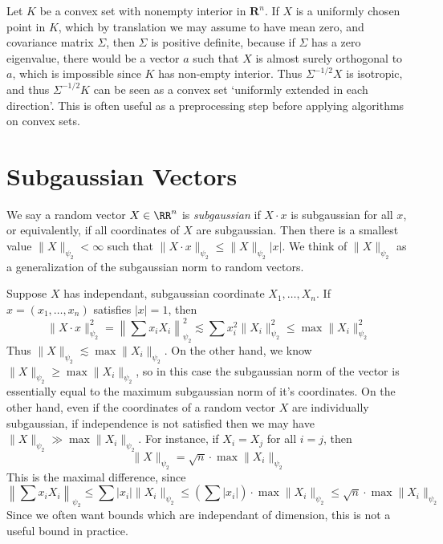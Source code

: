 \begin{example}
    Let $K$ be a convex set with nonempty interior in $\mathbf{R}^n$. If $X$ is a uniformly chosen point in $K$, which by translation we may assume to have mean zero, and covariance matrix $\Sigma$, then $\Sigma$ is positive definite, because if $\Sigma$ has a zero eigenvalue, there would be a vector $a$ such that $X$ is almost surely orthogonal to $a$, which is impossible since $K$ has non-empty interior. Thus $\Sigma^{-1/2} X$ is isotropic, and thus $\Sigma^{-1/2} K$ can be seen as a convex set `uniformly extended in each direction'. This is often useful as a preprocessing step before applying algorithms on convex sets.
\end{example}

\section{Subgaussian Vectors}

We say a random vector $X \in \RR^n$ is {\it subgaussian} if $X \cdot x$ is subgaussian for all $x$, or equivalently, if all coordinates of $X$ are subgaussian. Then there is a smallest value $\| X \|_{\psi_2} < \infty$ such that $\| X \cdot x \|_{\psi_2} \leq \| X \|_{\psi_2} |x|$. We think of $\| X \|_{\psi_2}$ as a generalization of the subgaussian norm to random vectors.

\begin{example}
    Suppose $X$ has independant, subgaussian coordinate $X_1, \dots, X_n$. If $x = (x_1, \dots, x_n)$ satisfies $|x| = 1$, then
    \[ \| X \cdot x \|_{\psi_2}^2 = \left\| \sum x_i X_i \right\|_{\psi_2}^2 \lesssim \sum x_i^2 \| X_i \|_{\psi_2}^2 \leq \max \| X_i \|_{\psi_2}^2 \]
    Thus $\| X \|_{\psi_2} \lesssim \max \| X_i \|_{\psi_2}$. On the other hand, we know $\| X \|_{\psi_2} \geq \max \| X_i \|_{\psi_2}$, so in this case the subgaussian norm of the vector is essentially equal to the maximum subgaussian norm of it's coordinates. On the other hand, even if the coordinates of a random vector $X$ are individually subgaussian, if independence is not satisfied then we may have $\| X \|_{\psi_2} \gg \max \| X_i \|_{\psi_2}$. For instance, if $X_i = X_j$ for all $i = j$, then
    \[ \| X \|_{\psi_2} = \sqrt{n} \cdot \max \| X_i \|_{\psi_2} \]
    This is the maximal difference, since
    \[ \left\| \sum x_i X_i \right\|_{\psi_2} \leq \sum |x_i| \| X_i \|_{\psi_2} \leq \left( \sum |x_i| \right) \cdot \max \| X_i \|_{\psi_2} \leq \sqrt{n} \cdot \max \| X_i \|_{\psi_2} \]
    Since we often want bounds which are independant of dimension, this is not a useful bound in practice.
\end{example}

